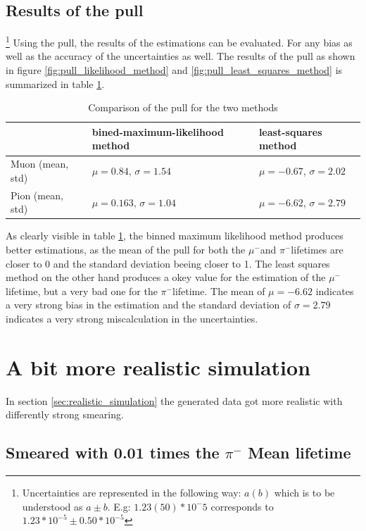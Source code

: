 \documentclass[11pt, a4paper, oneside]{book}
\newcommand{\pion}{$\pi^{-}$}
\newcommand{\muon}{$\mu^{-}$}
\begin{document}
\subsection{Results of the pull} \footnote{Uncertainties are represented in the following way: $a(b)$ which is to be understood as $a \pm b$. E.g: $1.23(50)*10^-5$ corresponds to $1.23*10^{-5} \pm 0.50 * 10^{-5}$}
Using the pull, the results of the estimations can be evaluated. For any bias as well as the accuracy of the uncertainties as well. The results of the pull as shown in figure \ref{fig:pull_likelihood_method} and \ref{fig:pull_least_squares_method} is summarized in table \ref{tab:pull_results}.

\begin{table}[H]
  \begin{tabular}{lll}
                                        & bined-maximum-likelihood method & least-squares method \\ \hline
  \multicolumn{1}{l|}{Muon (mean, std)} & $\mu = 0.84$, $\sigma = 1.54 $             & $\mu = -0.67$, $\sigma = 2.02$  \\
  \multicolumn{1}{l|}{Pion (mean, std)} & $\mu = 0.163$, $\sigma = 1.04$            & $\mu = -6.62$, $\sigma = 2.79$ 
  \end{tabular}
  \caption{Comparison of the pull for the two methods}
  \label{tab:pull_results}
\end{table}

As clearly visible in table \ref{tab:pull_results}, the binned maximum likelihood method produces better estimations, as the mean of the pull for both the \muon and \pion lifetimes are closer to 0 and the standard deviation beeing closer to 1. The least squares method on the other hand produces a okey value for the estimation of the \muon lifetime, but a very bad one for the \pion lifetime. The mean of $\mu = -6.62$ indicates a very strong bias in the estimation and the standard deviation of $\sigma = 2.79$ indicates a very strong miscalculation in the uncertainties. 

\newpage
\section{A bit more realistic simulation}

In section \ref{sec:realistic_simulation} the generated data got more realistic with differently strong smearing.

\subsection{Smeared with 0.01 times the \texorpdfstring{\pion}{pion} Mean lifetime}
\end{document}
